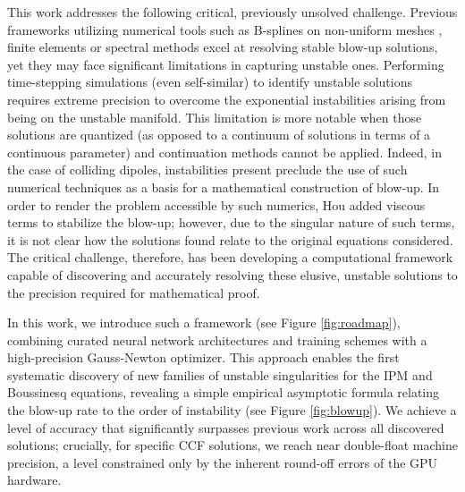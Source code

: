 \documentclass[fleqn,11pt]{wlscirep}
\begin{document}
This work addresses the following critical, previously unsolved challenge. Previous frameworks utilizing numerical tools such as B-splines on non-uniform meshes \cite{Luo-Hou:singularities-euler-3d}, finite elements \cite{Guillod-Sverak:numerics-nonuniqueness-ns} or spectral methods \cite{Lushnikov-Silantyev-Siegel:self-similar-gclm} excel at resolving stable blow-up solutions, yet they may face significant limitations in capturing unstable ones. Performing time-stepping simulations (even self-similar) to identify unstable solutions requires extreme precision to overcome the exponential instabilities arising from being on the unstable manifold. This limitation is more notable when those solutions are quantized (as opposed to a continuum of solutions in terms of a continuous parameter) and continuation methods cannot be applied.
Indeed, in the case of colliding dipoles, instabilities present preclude the use of such numerical techniques as a basis for a mathematical construction of blow-up. In order to render the problem accessible by such numerics, Hou \cite{Hou:potential-singularity-euler} added viscous terms to stabilize the blow-up; however, due to the singular nature of such terms, it is not clear how the solutions found relate to the original equations considered. The critical challenge, therefore, has been developing a computational framework capable of discovering and accurately resolving these elusive, unstable solutions to the precision required for mathematical proof.

In this work, we introduce such a framework (see Figure \ref{fig:roadmap}), combining curated neural network architectures and training schemes with a high-precision Gauss-Newton optimizer. This approach enables the first systematic discovery of new families of unstable singularities for the IPM and Boussinesq equations, revealing a simple empirical asymptotic formula relating the blow-up rate to the order of instability (see Figure \ref{fig:blowup}). We achieve a level of accuracy that significantly surpasses previous work across all discovered solutions; crucially, for specific CCF solutions, we reach near double-float machine precision, a level constrained only by the inherent round-off errors of the GPU hardware. 
\end{document}

